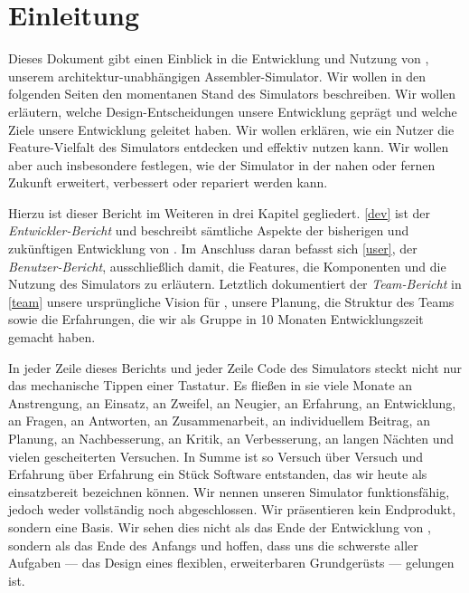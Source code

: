 
\chapter*{Einleitung}

Dieses Dokument gibt einen Einblick in die Entwicklung und Nutzung von
\erasim{}, unserem architektur-unabhängigen Assembler-Simulator. Wir wollen in
den folgenden Seiten den momentanen Stand des Simulators beschreiben. Wir wollen
erläutern, welche Design-Entscheidungen unsere Entwicklung geprägt und welche
Ziele unsere Entwicklung geleitet haben. Wir wollen erklären, wie ein Nutzer die
Feature-Vielfalt des Simulators entdecken und effektiv nutzen kann. Wir wollen
aber auch insbesondere festlegen, wie der Simulator in der nahen oder fernen
Zukunft erweitert, verbessert oder repariert werden kann.

Hierzu ist dieser Bericht im Weiteren in drei Kapitel gegliedert. \autoref{dev}
ist der \emph{Entwickler-Bericht} und beschreibt sämtliche Aspekte der
bisherigen und zukünftigen Entwicklung von \erasim{}. Im Anschluss daran befasst
sich \autoref{user}, der \emph{Benutzer-Bericht}, ausschließlich damit, die
Features, die Komponenten und die Nutzung des Simulators zu erläutern. Letztlich
dokumentiert der \emph{Team-Bericht} in \autoref{team} unsere ursprüngliche
Vision für \erasim{}, unsere Planung, die Struktur des Teams sowie die
Erfahrungen, die wir als Gruppe in 10 Monaten Entwicklungszeit gemacht haben.

In jeder Zeile dieses Berichts und jeder Zeile Code des Simulators steckt nicht
nur das mechanische Tippen einer Tastatur. Es fließen in sie viele Monate an
Anstrengung, an Einsatz, an Zweifel, an Neugier, an Erfahrung, an Entwicklung,
an Fragen, an Antworten, an Zusammenarbeit, an individuellem Beitrag, an
Planung, an Nachbesserung, an Kritik, an Verbesserung, an langen Nächten und
vielen gescheiterten Versuchen. In Summe ist so Versuch über Versuch und
Erfahrung über Erfahrung ein Stück Software entstanden, das wir heute als
einsatzbereit bezeichnen können. Wir nennen unseren Simulator funktionsfähig,
jedoch weder vollständig noch abgeschlossen. Wir präsentieren kein Endprodukt,
sondern eine Basis. Wir sehen dies nicht als das Ende der Entwicklung von
\erasim{}, sondern als das Ende des Anfangs und hoffen, dass uns die schwerste
aller Aufgaben --- das Design eines flexiblen, erweiterbaren Grundgerüsts ---
gelungen ist.
